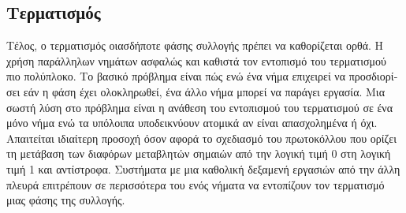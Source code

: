 \begin{greek}
\subsection{Τερματισμός}
Τέλος, ο τερματισμός οιασδήποτε φάσης συλλογής πρέπει να καθορίζεται
ορθά. Η χρήση παράλληλων νημάτων ασφαλώς και καθιστά τον εντοπισμό
του τερματισμού πιο πολύπλοκο. Το βασικό πρόβλημα είναι πώς ενώ
ένα νήμα επιχειρεί να προσδιορίσει εάν η φάση έχει ολοκληρωθεί,
ένα άλλο νήμα μπορεί να παράγει εργασία. Μια σωστή λύση στο
πρόβλημα είναι η ανάθεση του εντοπισμού του τερματισμού σε ένα
μόνο νήμα ενώ τα υπόλοιπα υποδεικνύουν ατομικά αν είναι απασχολημένα
ή όχι. Απαιτείται ιδιαίτερη προσοχή όσον αφορά το σχεδιασμό του
πρωτοκόλλου που ορίζει τη μετάβαση των διαφόρων μεταβλητών σημαιών
από την λογική τιμή 0 στη λογική τιμή 1 και αντίστροφα. Συστήματα
με μια καθολική δεξαμενή εργασιών από την άλλη πλευρά επιτρέπουν
σε περισσότερα του ενός νήματα να εντοπίζουν τον τερματισμό μιας
φάσης της συλλογής. 

\end{greek}
